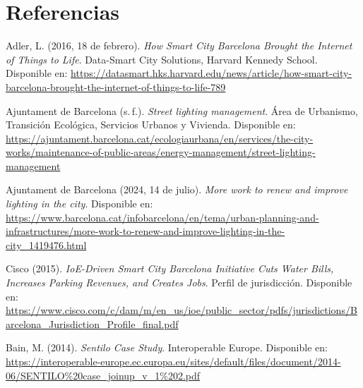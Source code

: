 \documentclass[12pt,a4paper]{article}
\begin{document}
\section*{Referencias}
\begin{thebibliography}{99}

Adler, L. (2016, 18 de febrero).
\textit{How Smart City Barcelona Brought the Internet of Things to Life}.
Data-Smart City Solutions, Harvard Kennedy School.
Disponible en:
\url{https://datasmart.hks.harvard.edu/news/article/how-smart-city-barcelona-brought-the-internet-of-things-to-life-789}

Ajuntament de Barcelona (s.\,f.).
\textit{Street lighting management}.
Área de Urbanismo, Transición Ecológica, Servicios Urbanos y Vivienda.
Disponible en:
\url{https://ajuntament.barcelona.cat/ecologiaurbana/en/services/the-city-works/maintenance-of-public-areas/energy-management/street-lighting-management}

Ajuntament de Barcelona (2024, 14 de julio).
\textit{More work to renew and improve lighting in the city}.
Disponible en:
\url{https://www.barcelona.cat/infobarcelona/en/tema/urban-planning-and-infrastructures/more-work-to-renew-and-improve-lighting-in-the-city_1419476.html}

Cisco (2015).
\textit{IoE-Driven Smart City Barcelona Initiative Cuts Water Bills, Increases Parking Revenues, and Creates Jobs}.
Perfil de jurisdicción.
Disponible en:
\url{https://www.cisco.com/c/dam/m/en_us/ioe/public_sector/pdfs/jurisdictions/Barcelona_Jurisdiction_Profile_final.pdf}

Bain, M. (2014).
\textit{Sentilo Case Study}.
Interoperable Europe.
Disponible en:
\url{https://interoperable-europe.ec.europa.eu/sites/default/files/document/2014-06/SENTILO%20case_joinup_v_1%202.pdf}

\end{thebibliography}
\end{document}
